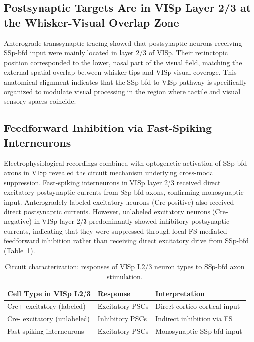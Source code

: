 \documentclass[11pt]{article}
\begin{document}
\subsection{Postsynaptic Targets Are in VISp Layer 2/3 at the Whisker-Visual Overlap Zone}

Anterograde transsynaptic tracing showed that postsynaptic neurons receiving SSp-bfd input were mainly located in layer 2/3 of VISp. Their retinotopic position corresponded to the lower, nasal part of the visual field, matching the external spatial overlap between whisker tips and VISp visual coverage. This anatomical alignment indicates that the SSp-bfd to VISp pathway is specifically organized to modulate visual processing in the region where tactile and visual sensory spaces coincide.

\subsection{Feedforward Inhibition via Fast-Spiking Interneurons}

Electrophysiological recordings combined with optogenetic activation of SSp-bfd axons in VISp revealed the circuit mechanism underlying cross-modal suppression. Fast-spiking interneurons in VISp layer 2/3 received direct excitatory postsynaptic currents from SSp-bfd axons, confirming monosynaptic input. Anterogradely labeled excitatory neurons (Cre-positive) also received direct postsynaptic currents. However, unlabeled excitatory neurons (Cre-negative) in VISp layer 2/3 predominantly showed inhibitory postsynaptic currents, indicating that they were suppressed through local FS-mediated feedforward inhibition rather than receiving direct excitatory drive from SSp-bfd (Table~\ref{tab:circuit}).

\begin{table}[htbp]
\centering
\caption{Circuit characterization: responses of VISp L2/3 neuron types to SSp-bfd axon stimulation.}
\label{tab:circuit}
\begin{tabular}{lll}
\toprule
Cell Type in VISp L2/3 & Response & Interpretation \\
\midrule
Cre+ excitatory (labeled) & Excitatory PSCs & Direct cortico-cortical input \\
Cre- excitatory (unlabeled) & Inhibitory PSCs & Indirect inhibition via FS \\
Fast-spiking interneurons & Excitatory PSCs & Monosynaptic SSp-bfd input \\
\bottomrule
\end{tabular}
\end{table}
\end{document}
